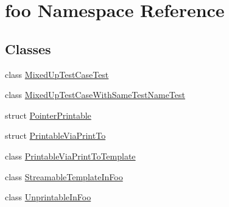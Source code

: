 \hypertarget{namespacefoo}{}\section{foo Namespace Reference}
\label{namespacefoo}
\subsection*{Classes}
\begin{DoxyCompactItemize}
\item 
class \hyperlink{classfoo_1_1MixedUpTestCaseTest}{Mixed\+Up\+Test\+Case\+Test}
\item 
class \hyperlink{classfoo_1_1MixedUpTestCaseWithSameTestNameTest}{Mixed\+Up\+Test\+Case\+With\+Same\+Test\+Name\+Test}
\item 
struct \hyperlink{structfoo_1_1PointerPrintable}{Pointer\+Printable}
\item 
struct \hyperlink{structfoo_1_1PrintableViaPrintTo}{Printable\+Via\+Print\+To}
\item 
class \hyperlink{classfoo_1_1PrintableViaPrintToTemplate}{Printable\+Via\+Print\+To\+Template}
\item 
class \hyperlink{classfoo_1_1StreamableTemplateInFoo}{Streamable\+Template\+In\+Foo}
\item 
class \hyperlink{classfoo_1_1UnprintableInFoo}{Unprintable\+In\+Foo}
\end{DoxyCompactItemize}
